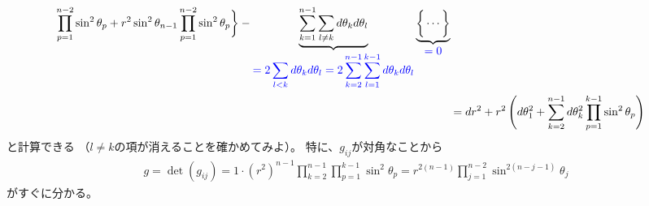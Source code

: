 \begin{align}
        \prod_{p=1}^{n-2}
        \sin^2 \theta_p
    +
        r^2 \sin^2 \theta_{n-1}
        \prod_{p=1}^{n-2}
        \sin^2 \theta_p
    \bigg\}
    -
\underbrace{
    \sum_{k = 1}^{n - 1}
    \sum_{l \neq k}
    d \theta_k
    d \theta_l
}_{\substack{
\displaystyle
\color{blue} =
    2
    \sum_{l < k}
    d \theta_k
    d \theta_l
=
    2 \sum_{k = 2}^{n - 1}
    \sum_{l = 1}^{k-1}
    d \theta_k
    d \theta_l
}}
    \underbrace{
    \bigg\{
        \cdots
    \bigg\}
    }_{\substack{\displaystyle
        \color{blue} = 0
    }}
\notag\\&
=
    d r^2
+
    r^2
\left(
        d \theta_1^2
    +
    \sum_{k=2}^{n-1}
        d\theta_k^2
    \prod_{p=1}^{k-1}
        \sin^2 \theta_p
\right)
\label{n dim spherical coord metric}
\end{align}
と計算できる
（$l \neq k$の項が消えることを確かめてみよ）。
特に、$g_{ij}$が対角なことから
\begin{align}
    g =
    \det ( g_{ij} )
=
    1 \cdot (r^2)^{n-1}
    \prod_{k=2}^{n-1}
    \prod_{p=1}^{k-1}
        \sin^2 \theta_p
=
    r^{2(n-1)}
    \prod_{j = 1}^{n-2}
    \sin^{2(n - j - 1)} \theta_j
\end{align}
がすぐに分かる。

